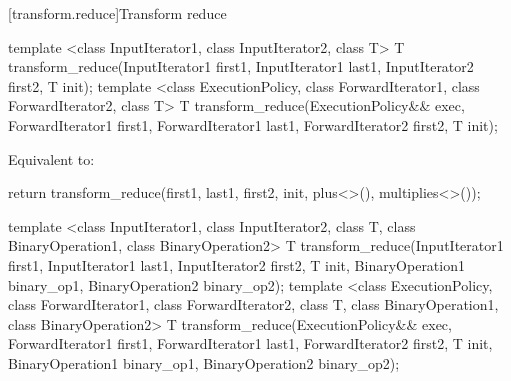[transform.reduce]{Transform reduce}
%
\begin{itemdecl}
template <class InputIterator1, class InputIterator2, class T>
  T transform_reduce(InputIterator1 first1, InputIterator1 last1,
                     InputIterator2 first2,
                     T init);
template <class ExecutionPolicy,
          class ForwardIterator1, class ForwardIterator2, class T>
  T transform_reduce(ExecutionPolicy&& exec,
                     ForwardIterator1 first1, ForwardIterator1 last1,
                     ForwardIterator2 first2,
                     T init);
\end{itemdecl}

\begin{itemdescr}
\pnum
\effects Equivalent to:
\begin{codeblock}
return transform_reduce(first1, last1, first2, init, plus<>(), multiplies<>());
\end{codeblock}
\end{itemdescr}

%
\begin{itemdecl}
template <class InputIterator1, class InputIterator2, class T,
          class BinaryOperation1, class BinaryOperation2>
  T transform_reduce(InputIterator1 first1, InputIterator1 last1,
                     InputIterator2 first2,
                     T init,
                     BinaryOperation1 binary_op1,
                     BinaryOperation2 binary_op2);
template <class ExecutionPolicy,
          class ForwardIterator1, class ForwardIterator2, class T,
          class BinaryOperation1, class BinaryOperation2>
  T transform_reduce(ExecutionPolicy&& exec,
                     ForwardIterator1 first1, ForwardIterator1 last1,
                     ForwardIterator2 first2,
                     T init,
                     BinaryOperation1 binary_op1,
                     BinaryOperation2 binary_op2);
\end{itemdecl}

